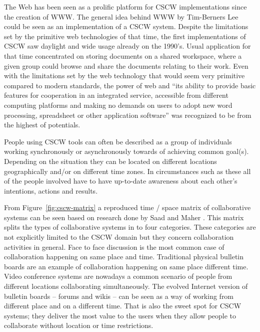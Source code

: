 The Web has been seen as a prolific platform for CSCW implementations since the creation of WWW. The general idea behind WWW by Tim-Berners Lee could be seen as an implementation of a CSCW system. Despite the limitations set by the primitive web technologies of that time, the first implementations of CSCW saw daylight and wide usage already on the 1990's. Usual application for that time concentrated on storing documents on a shared workspace, where a given group could browse and share the documents relating to their work. Even with the limitations set by the web technology that would seem very primitive compared to modern standards, the power of web and ``its ability to provide basic features for cooperation in an integrated service, accessible from different computing platforms and making no demands on users to adopt new word processing, spreadsheet or other application software'' was recognized to be from the highest of potentials. \cite{bentley_basic_1997}

People using CSCW tools can often be described as a group of individuals working synchronously or asynchronously towards of achieving common goal(s). Depending on the situation they can be located on different locations geographically and/or on different time zones. In circumstances such as these all of the people involved have to have up-to-date awareness about each other's intentions, actions and results. \cite{carroll_notification_2003}

From Figure~\ref{fig:cscw-matrix} a reproduced time / space matrix of collaborative systems can be seen based on research done by Saad and Maher \cite{saad_shared_1996}. This matrix splits the types of collaborative systems in to four categories. These categories are not explicitly limited to the CSCW domain but they concern collaboration activities in general. Face to face discussion is the most common case of collaboration happening on same place and time. Traditional physical bulletin boards are an example of collaboration happening on same place different time. Video conference systems are nowadays a common scenario of people from different locations collaborating simultaneously. The evolved Internet version of bulletin boards -- forums and wikis -- can be seen as a way of working from different place and on a different time. That is also the sweet spot for CSCW systems; they deliver the most value to the users when they allow people to collaborate without location or time restrictions. %

